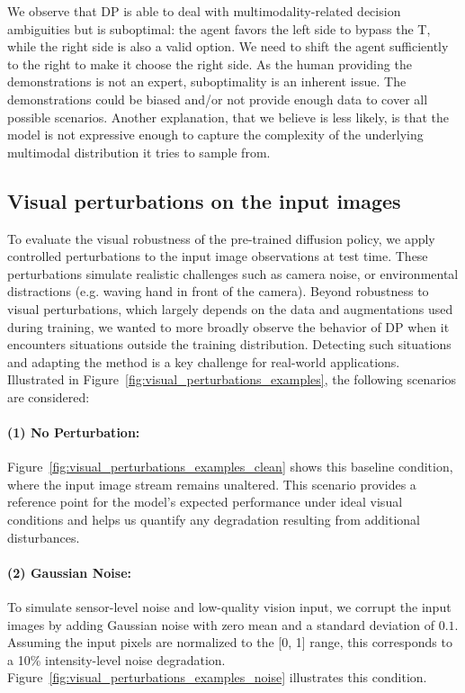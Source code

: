 We observe that DP is able to deal with multimodality-related decision ambiguities but is suboptimal: the agent
favors the left side to bypass the T, while the right side is also a valid option. We need to shift the agent
sufficiently to the right to make it choose the right side.
As the human providing the demonstrations is not an expert, suboptimality is an inherent issue.
The demonstrations could be biased and/or not provide enough data to cover all possible scenarios.
Another explanation, that we believe is less likely, is that the model is not expressive enough to capture
the complexity of the underlying multimodal distribution it tries to sample from.


\subsection{Visual perturbations on the input images}\label{sec:visual_perturbations}

To evaluate the visual robustness of the pre-trained diffusion policy, we apply controlled perturbations to the input image observations at test time.
These perturbations simulate realistic challenges such as camera noise, or environmental distractions (e.g. waving hand in front of the camera).
Beyond robustness to visual perturbations, which largely depends on the data and augmentations used
during training, we wanted to more broadly observe the behavior of DP when it encounters situations
outside the training distribution.
Detecting such situations and adapting the method is a key challenge for real-world applications.
Illustrated in Figure~\ref{fig:visual_perturbations_examples}, the following scenarios are considered:

\paragraph{(1) No Perturbation:}
Figure~\ref{fig:visual_perturbations_examples_clean} shows this baseline condition, where the input image stream remains unaltered.
This scenario provides a reference point for the model's expected performance under ideal visual conditions and helps us quantify any degradation resulting from additional disturbances.

\paragraph{(2) Gaussian Noise:}
To simulate sensor-level noise and low-quality vision input, we corrupt the input images by adding Gaussian noise with zero mean and a standard deviation of $0.1$.
Assuming the input pixels are normalized to the [0, 1] range, this corresponds to a 10\% intensity-level noise degradation.
Figure~\ref{fig:visual_perturbations_examples_noise} illustrates this condition.

